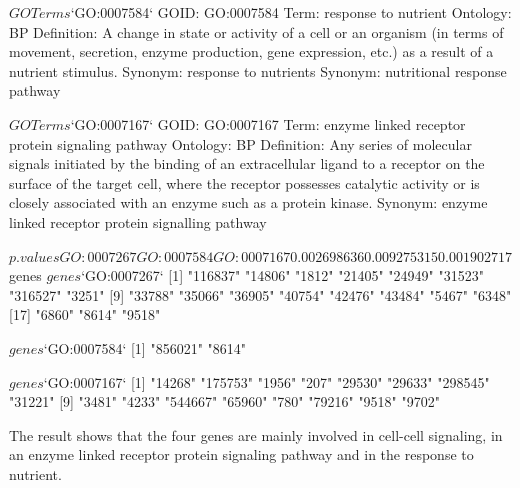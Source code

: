 \documentclass[12pt,a4paper]{article}
\begin{document}
\begin{Schunk}
\begin{Soutput}
$GOTerms$`GO:0007584`
GOID: GO:0007584
Term: response to nutrient
Ontology: BP
Definition: A change in state or activity of a cell or an organism (in
    terms of movement, secretion, enzyme production, gene expression,
    etc.) as a result of a nutrient stimulus.
Synonym: response to nutrients
Synonym: nutritional response pathway

$GOTerms$`GO:0007167`
GOID: GO:0007167
Term: enzyme linked receptor protein signaling pathway
Ontology: BP
Definition: Any series of molecular signals initiated by the binding of
    an extracellular ligand to a receptor on the surface of the target
    cell, where the receptor possesses catalytic activity or is closely
    associated with an enzyme such as a protein kinase.
Synonym: enzyme linked receptor protein signalling pathway


$p.values
 GO:0007267  GO:0007584  GO:0007167 
0.002698636 0.009275315 0.001902717 

$genes
$genes$`GO:0007267`
 [1] "116837" "14806"  "1812"   "21405"  "24949"  "31523"  "316527" "3251"  
 [9] "33788"  "35066"  "36905"  "40754"  "42476"  "43484"  "5467"   "6348"  
[17] "6860"   "8614"   "9518"  

$genes$`GO:0007584`
[1] "856021" "8614"  

$genes$`GO:0007167`
 [1] "14268"  "175753" "1956"   "207"    "29530"  "29633"  "298545" "31221" 
 [9] "3481"   "4233"   "544667" "65960"  "780"    "79216"  "9518"   "9702"  
\end{Soutput}
\end{Schunk}
The result shows that the four genes are mainly involved in cell-cell signaling, in an enzyme linked receptor protein signaling pathway and in the response to nutrient.



\end{document}
